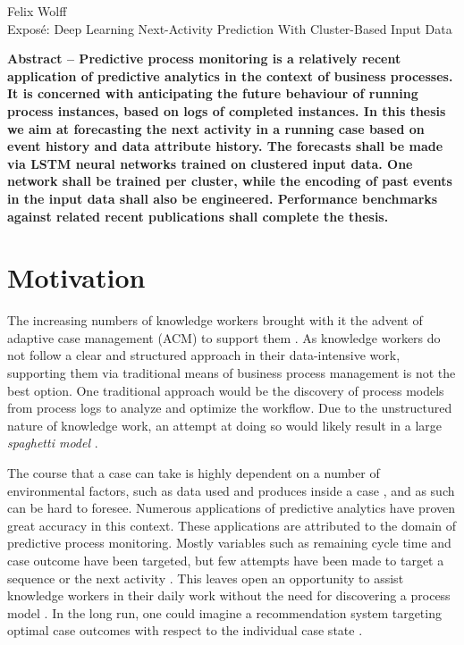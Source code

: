 \documentclass[%
	paper=A4,
	twoside=false,				%
	openright,					%
	parskip=full,				%
	chapterprefix=true,			%
	11pt,						%
	headings=normal,			%
	bibliography=totoc,			%
	listof=totoc,				%
	titlepage=on,				%
	captions=tableabove,		%
	draft=false,				%
]{scrreprt}
\newcommand{\thesisTitle}{Exposé: Deep Learning Next-Activity Prediction With Cluster-Based Input Data}
\newcommand{\thesisName}{Felix Wolff}
\begin{document}
\setcounter{page}{1}
\pagestyle{maincontentstyle}

{\large \thesisName} \\[2mm]
{\LARGE \thesisTitle}

\textbf{Abstract -- Predictive process monitoring is a relatively recent application of predictive analytics in the context of business processes. It is concerned with anticipating the future behaviour of running process instances, based on logs of completed instances. In this thesis we aim at forecasting the next activity in a running case based on event history and data attribute history. The forecasts shall be made via LSTM neural networks trained on clustered input data. One network shall be trained per cluster, while the encoding of past events in the input data shall also be engineered. Performance benchmarks against related recent publications shall complete the thesis.}

\section*{Motivation}
The increasing numbers of knowledge workers brought with it the advent of adaptive case management (ACM) to support them \cite{drucker1999, leclair2009}.
As knowledge workers do not follow a clear and structured approach in their data-intensive work, supporting them via traditional means of business process management is not the best option.
One traditional approach would be the discovery of process models from process logs to analyze and optimize the workflow.
Due to the unstructured nature of knowledge work, an attempt at doing so would likely result in a large \textit{spaghetti model} \cite[ch.14]{Aalst16}.

The course that a case can take is highly dependent on a number of environmental factors, such as data used and produces inside a case \cite{schoenig2018}, and as such can be hard to foresee.
Numerous applications of predictive analytics have proven great accuracy in this context.
These applications are attributed to the domain of predictive process monitoring.
Mostly variables such as remaining cycle time and case outcome have been targeted, but few attempts have been made to target a sequence or the next activity \cite{francescomarino2018, rogge2013}.
This leaves open an opportunity to assist knowledge workers in their daily work without the need for discovering a process model \cite{hauder2014}.
In the long run, one could imagine a recommendation system targeting optimal case outcomes with respect to the individual case state \cite{leclair2009,hauder2014}.
\end{document}

